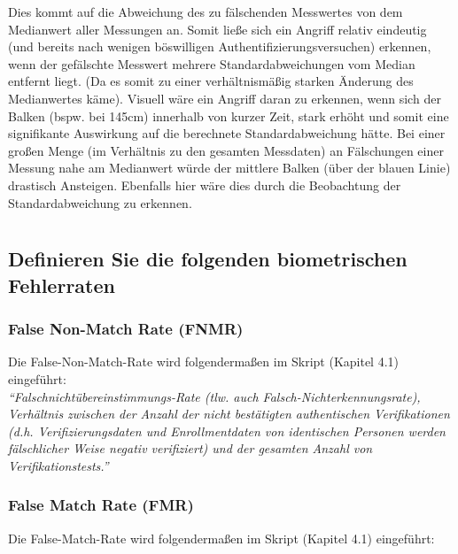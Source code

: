 \documentclass{article}
\begin{document}
Dies kommt auf die Abweichung des zu fälschenden Messwertes von dem Medianwert aller Messungen an.
Somit ließe sich ein Angriff relativ eindeutig (und bereits nach wenigen böswilligen 
Authentifizierungsversuchen) erkennen, wenn der gefälschte Messwert mehrere Standardabweichungen vom 
Median entfernt liegt. (Da es somit zu einer verhältnismäßig starken Änderung des Medianwertes käme). 
Visuell wäre ein Angriff daran zu erkennen, wenn sich der Balken (bspw. bei 145cm) innerhalb von kurzer 
Zeit, stark erhöht und somit eine signifikante Auswirkung auf die berechnete Standardabweichung hätte. Bei 
einer großen Menge (im Verhältnis zu den gesamten Messdaten) an Fälschungen einer Messung nahe am 
Medianwert würde der mittlere Balken (über der blauen Linie) drastisch Ansteigen. Ebenfalls hier wäre
dies durch die Beobachtung der Standardabweichung zu erkennen.

\newpage

\section{}

\subsection{Definieren Sie die folgenden biometrischen Fehlerraten}

\subsubsection{False Non-Match Rate (FNMR)}

Die False-Non-Match-Rate wird folgendermaßen im Skript (Kapitel 4.1) eingeführt:\\[0.1em]

\textit{
``Falschnichtübereinstimmungs-Rate (tlw. auch Falsch-Nichterkennungsrate), Verhältnis zwischen der Anzahl der nicht bestätigten authentischen Verifikationen (d.h. Verifizierungsdaten und Enrollmentdaten von identischen Personen werden fälschlicher Weise negativ verifiziert) und der gesamten Anzahl von Verifikationstests.''
}

\subsubsection{False Match Rate (FMR)}

Die False-Match-Rate wird folgendermaßen im Skript (Kapitel 4.1) eingeführt:\\[0.1em]
\end{document}
